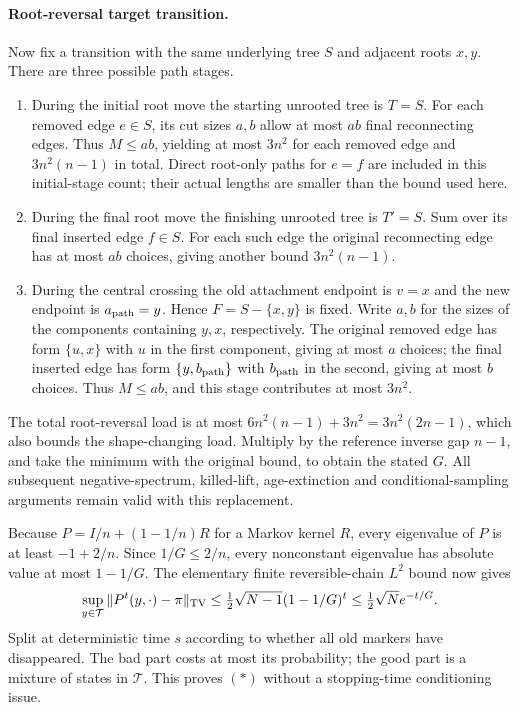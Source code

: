 \documentclass[11pt]{article}
\begin{document}
\paragraph{Root-reversal target transition.}
Now fix a transition with the same underlying tree $S$ and adjacent
roots $x,y$. There are three possible path stages.
\begin{enumerate}
\item During the initial root move the starting unrooted tree is
$T=S$. For each removed edge $e\in S$, its cut sizes $a,b$ allow
at most $ab$ final reconnecting edges. Thus $M\le ab$, yielding
at most $3n^2$ for each removed edge and $3n^2(n-1)$ in total.
Direct root-only paths for $e=f$ are included in this initial-stage
count; their actual lengths are smaller than the bound used here.
\item During the final root move the finishing unrooted tree is
$T'=S$. Sum over its final inserted edge $f\in S$. For each such
edge the original reconnecting edge has at most $ab$ choices, giving
another bound $3n^2(n-1)$.
\item During the central crossing the old attachment endpoint is
$v=x$ and the new endpoint is $a_{\rm path}=y$. Hence
$F=S-\{x,y\}$ is fixed. Write $a,b$ for the sizes of the components
containing $y,x$, respectively. The original removed edge has form
$\{u,x\}$ with $u$ in the first component, giving at most $a$
choices; the final inserted edge has form $\{y,b_{\rm path}\}$
with $b_{\rm path}$ in the second, giving at most $b$ choices.
Thus $M\le ab$, and this stage contributes at most $3n^2$.
\end{enumerate}
The total root-reversal load is at most
$6n^2(n-1)+3n^2=3n^2(2n-1)$, which also bounds the shape-changing
load. Multiply by the reference inverse gap $n-1$, and take the
minimum with the original bound, to obtain the stated $G$. All subsequent
negative-spectrum, killed-lift, age-extinction and conditional-sampling
arguments remain valid with this replacement.

Because $P=I/n+(1-1/n)R$ for a Markov kernel $R$, every eigenvalue
of $P$ is at least $-1+2/n$. Since $1/G\le2/n$, every nonconstant
eigenvalue has absolute value at most $1-1/G$. The elementary
finite reversible-chain $L^2$ bound now gives
\[
 \sup_{y\in\mathcal T}\|P^t(y,\cdot)-\pi\|_{\rm TV}
 \le\tfrac12\sqrt{N-1}(1-1/G)^t
 \le\tfrac12\sqrt N e^{-t/G}.
\]
Split at deterministic time $s$ according to whether all old
markers have disappeared. The bad part costs at most its probability;
the good part is a mixture of states in $\mathcal T$. This proves
$(*)$ without a stopping-time conditioning issue.
\end{document}
